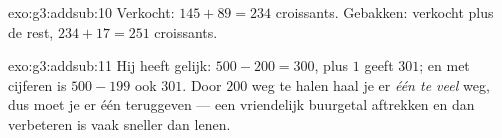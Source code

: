 \begin{solution}{exo:g3:addsub:10}
Verkocht: $145 + 89 = 234$ croissants. Gebakken: verkocht plus de rest,
$234 + 17 = 251$ croissants.
\end{solution}

\begin{solution}{exo:g3:addsub:11}
Hij heeft gelijk: $500 - 200 = 300$, plus $1$ geeft $301$; en met
cijferen is $500 - 199$ ook $301$. Door $200$ weg te halen haal je er
\emph{één te veel} weg, dus moet je er één teruggeven --- een
vriendelijk buurgetal aftrekken en dan verbeteren is vaak sneller dan
lenen.
\end{solution}

